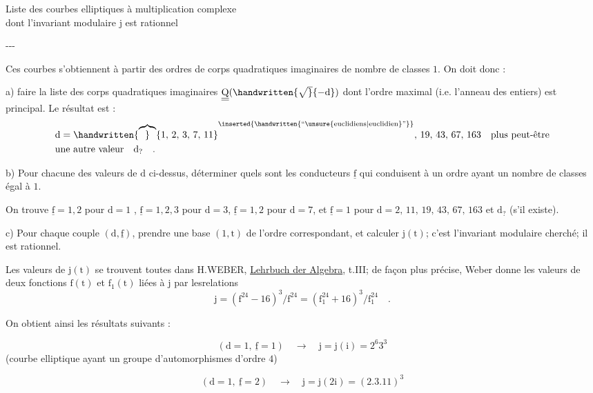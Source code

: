 \clearpage
{}
\reversemarginpar
{}
\normalmarginpar
{}

\begin{center}
Liste des courbes elliptiques à multiplication complexe\\
dont l'invariant modulaire $\mathrm{j}$ est rationnel

\medskip
-{}-{}-
\end{center}

Ces courbes s'obtiennent à partir des ordres de corps quadratiques imaginaires de nombre de classes $1$. On doit donc :

a) faire la liste des corps quadratiques imaginaires $\underline{\underline{\mathrm{Q}}}(\handwritten{\sqrt}{-\mathrm{d}})$ dont l'ordre maximal (i.e. l'anneau des entiers) est principal. Le résultat est :
\reversemarginpar
{}
\normalmarginpar
\[
\begin{aligned}
&\mathrm{d} = \handwritten{\overbrace}{1,\,2,\,3,\,7,\,11}^{\inserted{\handwritten{\text{``\unsure{euclidiens|euclidien}''}}}},\,19,\,43,\,67,\,163 \quad \text{plus peut-être}\\
&\text{une autre valeur}\quad \mathrm{d}_{?}\quad .
\end{aligned}
\]

b) Pour chacune des valeurs de $\mathrm{d}$ ci-dessus, déterminer quels sont les conducteurs $\underline{\mathrm{f}}$ qui conduisent à un ordre ayant un nombre de classes égal à $1$.

On trouve $\underline{\mathrm{f}}=1,2$ pour $\mathrm{d}=1$ , $\underline{\mathrm{f}}=1,2,3$ pour $\mathrm{d}=3$, $\underline{\mathrm{f}}=1,2$ pour $\mathrm{d}=7$, et $\underline{\mathrm{f}}=1$ pour $\mathrm{d}=2,\,11,\,19,\,43,\,67,\,163$ et $\mathrm{d}_{?}$ (s'il existe).

c) Pour chaque couple $(\mathrm{d},\underline{\mathrm{f}})$, prendre une base $(1,\mathrm{t})$ de l'ordre correspondant, et calculer $\mathrm{j}(\mathrm{t})$; c'est l'invariant modulaire cherché; il est rationnel.

Les valeurs de $\mathrm{j}(\mathrm{t})$ se trouvent toutes dans H.WEBER, \uline{Lehrbuch der Algebra}, t.III; de façon plus précise, Weber donne les valeurs de deux fonctions $\mathrm{f}(\mathrm{t})$ et $\mathrm{f}_{1}(\mathrm{t})$ liées à $\mathrm{j}$ par lesrelations
\[
\mathrm{j}=(\mathrm{f}^{24}-16)^{3}/\mathrm{f}^{24}
       =(\mathrm{f}_{1}^{24}+16)^{3}/\mathrm{f}_{1}^{24}\quad .
\]

On obtient ainsi les résultats suivants :

\begingroup
\makeatletter\tagsleft@true\makeatother
\[
(\mathrm{d}=1,\ \underline{\mathrm{f}}=1)\quad \rightarrow\quad
\mathrm{j}=\mathrm{j}(\mathrm{i})=2^{6}3^{3}
\tag*{1.1.}
\]
(courbe elliptique ayant un groupe d'automorphismes d'ordre $4$)

\[
(\mathrm{d}=1,\ \underline{\mathrm{f}}=2)\quad \rightarrow\quad
\mathrm{j}=\mathrm{j}(2\mathrm{i})=(2.3.11)^{3}
\tag*{1.2}
\]
\endgroup
